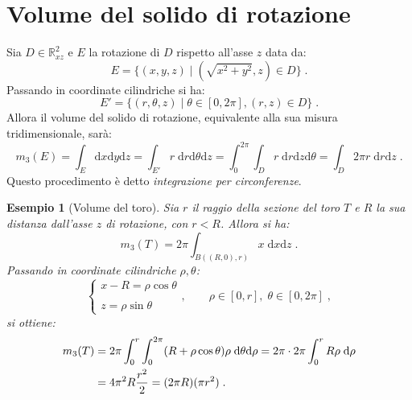 \documentclass[a4paper,12pt]{report}
\theoremstyle{plain}
\newtheorem{exm}{Esempio}[section]
\theoremstyle{definition}
\theoremstyle{remark}
\newcommand{\diff}[1]{\mathrm{d}#1}
\numberwithin{equation}{section}
\begin{document}
\section{Volume del solido di rotazione}
Sia $D\in \mathbb{R}^2_{xz}$ e $E$ la rotazione di $D$ rispetto all'asse $z$ data da:
\begin{equation}
E=\{(x,y,z)\;|\; (\sqrt{x^2+y^2},z)\in D\}\;.
\end{equation}
Passando in coordinate cilindriche si ha:
\begin{equation}
E'=\{(r,\theta,z)\;|\; \theta\in[0,2\pi],(r,z)\in D\}\;.
\end{equation}
Allora il volume del solido di rotazione, equivalente alla sua misura tridimensionale, sarà:
\begin{equation}
m_3(E)=\int_E \diff{x}\diff{y}\diff{z}=\int_{E'} r\;\diff{r}\diff{\theta}\diff{z}=\int_0^{2\pi}\int_D r\;\diff{r}\diff{z}\diff{\theta}=\int_D 2\pi r\;\diff{r}\diff{z}\;.
\end{equation}
Questo procedimento è detto \textit{integrazione per circonferenze}.
\begin{exm}[Volume del toro]  Sia $r$ il raggio della sezione del toro $T$ e $R$ la sua distanza dall'asse $z$ di rotazione, con $r<R$. Allora si ha:
\begin{equation}
m_3(T)=2\pi\int_{B((R,0),r)} x\;\diff{x}\diff{z}\;.
\end{equation}
Passando in coordinate cilindriche $\rho,\theta$:
\begin{equation}
\begin{cases}
 x-R=\rho\cos\theta \\
\\
z=\rho\sin\theta
\end{cases},\qquad \rho\in [0,r],\;\theta\in[0,2\pi]\;,
\end{equation}
si ottiene:
\begin{align}
m_3(T) &= 2\pi\int_0^r\int_0^{2\pi} (R+\rho\cos\theta)\rho\;\diff{\theta}\diff{\rho}=2\pi\cdot 2\pi\int_0^r R\rho\;\diff{\rho} \notag \\
&=4\pi^2R\frac{r^2}{2}=(2\pi R)(\pi r^2)\;.
\end{align}
\end{exm}
\end{document}
